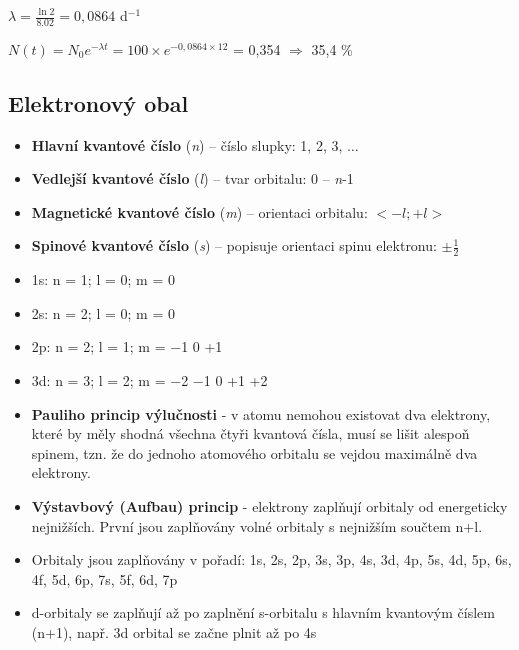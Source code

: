 
$\lambda = \frac{\ln 2}{8.02} = 0,0864$ d$^{-1}$

$N(t) = N_0e^{-\lambda t} = 100\times e^{-0,0864\times 12}$ = 0,354 $\Rightarrow$ 35,4 \%

\clearpage

\subsection{Elektronový obal}

\begin{itemize}
	\item \textbf{Hlavní kvantové číslo} (\textit{n}) -- číslo slupky: 1, 2, 3, $\ldots$
	\item \textbf{Vedlejší kvantové číslo} (\textit{l}) -- tvar orbitalu: 0 -- \textit{n}-1
	\item \textbf{Magnetické kvantové číslo} (\textit{m}) -- orientaci orbitalu: $<-l;+l>$
	\item \textbf{Spinové kvantové číslo} (\textit{s}) -- popisuje orientaci spinu elektronu: $\pm\frac{1}{2}$
\end{itemize}

\begin{itemize}[label=]
	\item 1s: n = 1; l = 0; m = 0
	\item 2s: n = 2; l = 0; m = 0
	\item 2p: n = 2; l = 1; m = $-$1 0 +1
	\item 3d: n = 3; l = 2; m = $-$2 $-$1 0 +1 +2
\end{itemize}

\begin{itemize}
	\item \textbf{Pauliho princip výlučnosti} - v atomu nemohou existovat dva elektrony, které by měly shodná všechna čtyři kvantová čísla, musí se lišit alespoň spinem, tzn. že do jednoho atomového orbitalu se vejdou maximálně dva elektrony.
	\item \textbf{Výstavbový (Aufbau) princip} - elektrony zaplňují orbitaly od energeticky nejnižších. První jsou zaplňovány volné orbitaly s nejnižším součtem n+l.
	\item Orbitaly jsou zaplňovány v pořadí: 1s, 2s, 2p, 3s, 3p, 4s, 3d, 4p, 5s, 4d, 5p, 6s, 4f, 5d, 6p, 7s, 5f, 6d, 7p
	\item d-orbitaly se zaplňují až po zaplnění s-orbitalu s hlavním kvantovým číslem (n+1), např. 3d orbital se začne plnit až po 4s
\end{itemize}

